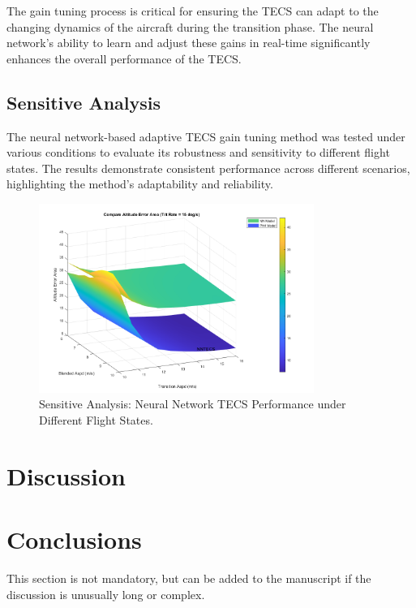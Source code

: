 \documentclass[journal,article,submit,pdftex,moreauthors]{Definitions/mdpi}
\begin{document}
The gain tuning process is critical for ensuring the TECS can adapt to the changing dynamics of the aircraft during the transition phase. The neural network's ability to learn and adjust these gains in real-time significantly enhances the overall performance of the TECS.

\subsection{Sensitive Analysis}
The neural network-based adaptive TECS gain tuning method was tested under various conditions to evaluate its robustness and sensitivity to different flight states. The results demonstrate consistent performance across different scenarios, highlighting the method's adaptability and reliability.

\begin{figure}[H]
    \centering
    \includegraphics[width=0.8\textwidth]{figures/sensitive_analysis.png}
    \caption{Sensitive Analysis: Neural Network TECS Performance under Different Flight States.}
    \label{fig:sensitive_analysis}
\end{figure}

\section{Discussion}



\section{Conclusions}

This section is not mandatory, but can be added to the manuscript if the discussion is unusually long or complex.
\end{document}
